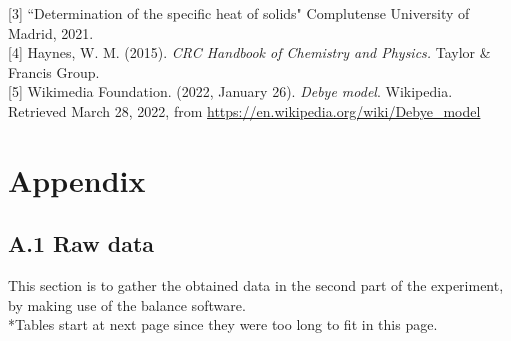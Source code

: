 \documentclass[a4paper, 12pt]{article}
\begin{document}
	[3] ``Determination of the specific heat of solids" Complutense University of Madrid, 2021.\\
	
	[4] Haynes, W. M. (2015). \textit{CRC Handbook of Chemistry and Physics.} Taylor \& Francis Group. \\
	
	[5] Wikimedia Foundation. (2022, January 26). \textit{Debye model}. Wikipedia. Retrieved March 28, 2022, from \url{https://en.wikipedia.org/wiki/Debye_model}

	\newpage
	\section{Appendix}
	\subsection{A.1 Raw data}
	This section is to gather the obtained data in the second part of the experiment, by making use of the balance software. \\
	
	\tiny{*Tables start at next page since they were too long to fit in this page.}
	
\end{document}
